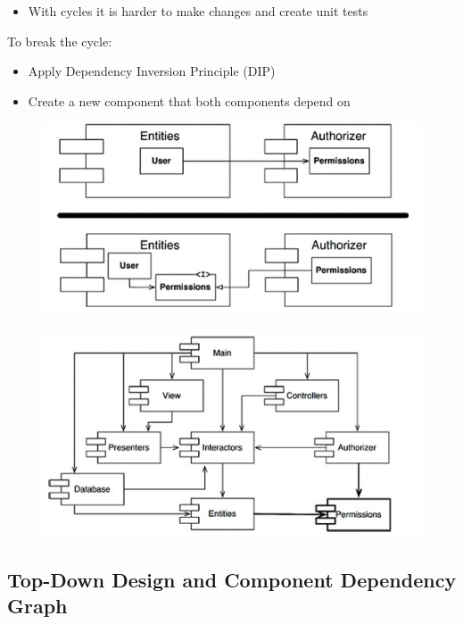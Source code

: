 \documentclass[../Main.tex]{subfiles}
\begin{document}
\begin{itemize}
    \item With cycles it is harder to make changes and create unit tests
\end{itemize}

To break the cycle:
\begin{itemize}
    \item Apply Dependency Inversion Principle (DIP)
    \item Create a new component that both components depend on
\end{itemize}

\begin{figure}[H]
    \centering
    \includegraphics[width=0.75\linewidth]{Images/cleanarch/breaking-the-cycle.png}
\end{figure}

\begin{figure}[H]
    \centering
    \includegraphics[width=0.75\linewidth]{Images/cleanarch/break-the-cycle-component.png}
\end{figure}

\subsection{Top-Down Design and Component Dependency Graph}
\end{document}
